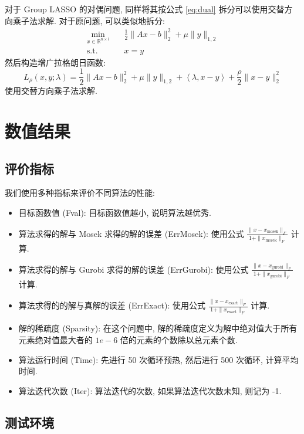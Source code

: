 \documentclass{article}
\begin{document}
对于 Group LASSO 的对偶问题, 同样将其按公式 \ref{eq:dual} 拆分可以使用交替方向乘子法求解. 对于原问题, 可以类似地拆分:
\begin{equation*}
    \begin{aligned}
        \min_{x \in \mathbb{R}^{n\times l}}\quad &\frac{1}{2} \|Ax - b\|_2^2 +
        \mu \|y\|_{1,2}\\
        \text{s.t.}\quad & x=y
    \end{aligned}
\end{equation*}
然后构造增广拉格朗日函数:
\begin{equation*}
    L_\rho(x, y; \lambda) = \frac{1}{2} \|Ax - b\|_2^2 + \mu \|y\|_{1,2} + \left<\lambda, x - y\right> + \frac{\rho}{2}\|x - y\|_2^2
\end{equation*}
使用交替方向乘子法求解.

\section{数值结果}

\subsection{评价指标}
我们使用多种指标来评价不同算法的性能:
\begin{itemize}
    \item 目标函数值 (Fval): 目标函数值越小, 说明算法越优秀.
    \item 算法求得的解与 Mosek 求得的解的误差 (ErrMosek): 使用公式 $\frac{\|x - x_{\text{mosek}}\|_F}{1+\|x_{\text{mosek}}\|_F}$ 计算.
    \item 算法求得的解与 Gurobi 求得的解的误差 (ErrGurobi): 使用公式 $\frac{\|x - x_{\text{gurobi}}\|_F}{1+\|x_{\text{gurobi}}\|_F}$ 计算.
    \item 算法求得的的解与真解的误差 (ErrExact): 使用公式 $\frac{\|x - x_{\text{exact}}\|_F}{1+\|x_{\text{exact}}\|_F}$ 计算.
    \item 解的稀疏度 (Sparsity): 在这个问题中, 解的稀疏度定义为解中绝对值大于所有元素绝对值最大者的 $1e-6$ 倍的元素的个数除以总元素个数.
    \item 算法运行时间 (Time): 先进行 50 次循环预热, 然后进行 500 次循环, 计算平均时间.
    \item 算法迭代次数 (Iter): 算法迭代的次数, 如果算法迭代次数未知, 则记为 -1.
\end{itemize}

\subsection{测试环境}
\end{document}
